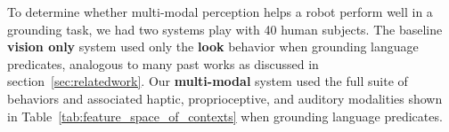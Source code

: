 To determine whether multi-modal perception helps a robot perform well in a grounding task, we had two systems play \ispy with 40 human subjects.
The baseline \textbf{vision only} system used only the \textbf{look} behavior when grounding language predicates, analogous to many past works as discussed in section~\ref{sec:relatedwork}.
Our \textbf{multi-modal} system used the full suite of behaviors and associated haptic, proprioceptive, and auditory modalities shown in Table~\ref{tab:feature_space_of_contexts} when grounding language predicates.